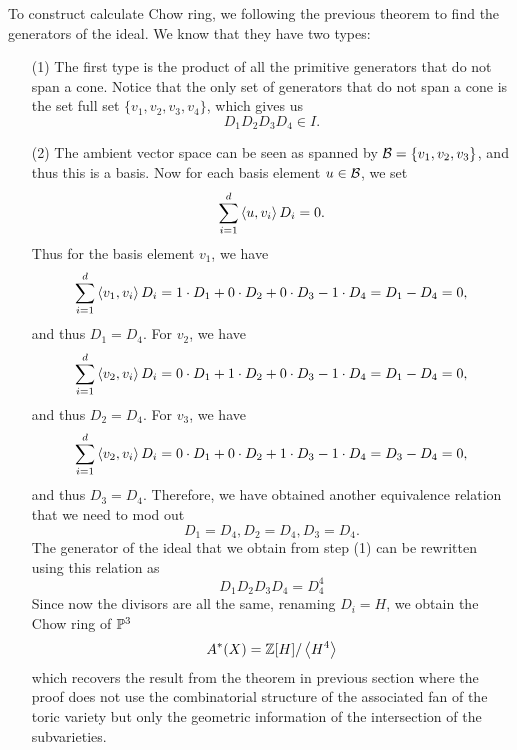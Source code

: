 \begin{example}
		To construct calculate Chow ring, we following 
		the previous theorem to find the generators of the ideal.
		We know that they have two types:
		\begin{enumerate}
			\item[(1)] The first type is the product of 
				all the primitive generators that do not span a cone.
				Notice that the only set of generators that 
				do not span a cone is the set full set 
				$\{v_1, v_2, v_3, v_4\}$,
				which gives us 
				\[
				D_1 D_2 D_3 D_4 \in I.
				\]
			\item[(2)] 
				The ambient vector space can be seen as 
				spanned by $\calb = \{v_1, v_2, v_3\}$,
				and thus this is a basis.
				Now for each basis element $u \in \calb$,
				we set 
				\[
				\sum\limits_{i = 1}^{d} \inner{u, v_i} D_i = 0. 
				\] 
				Thus for the basis element $v_1$, we have
				\[
				\sum\limits_{i = 1}^d \inner{v_1, v_i} D_i 
				= 1 \cdot D_1 + 0 \cdot D_2 + 0 \cdot D_3 - 1 \cdot D_4 = D_1 - D_4 = 0,
				\] and thus $D_1 = D_4$. 
				For $v_2$, we have 
				\[
				\sum\limits_{i = 1}^d \inner{v_2, v_i} D_i 
				= 0 \cdot D_1 + 1 \cdot D_2 + 0 \cdot D_3 - 1 \cdot D_4 = D_1 - D_4 = 0,
				\] and thus $D_2 = D_4$. 
				For $v_3$, we have 
				\[
				\sum\limits_{i = 1}^d \inner{v_2, v_i} D_i 
				= 0 \cdot D_1 + 0 \cdot D_2 + 1 \cdot D_3 - 1 \cdot D_4 = D_3 - D_4 = 0,
				\] and thus $D_3 = D_4$. 
				Therefore, 
				we have obtained another equivalence relation 
				that we need to mod out 
				\[
				D_1 = D_4, D_2 = D_4, D_3 = D_4.
				\]
				The generator of the ideal 
				that we obtain from step (1)
				can be rewritten using this relation as 
				\[
				D_1 D_2 D_3 D_4 = D_4^4
				\]
				Since now the divisors are all the same,
				renaming $D_i = H$, 
				we obtain the Chow ring of $\P^3$
				\[
				A^\ast(X) = \Z[H]/\inner{H^4}
				\]
				which recovers the result from the theorem 
				in previous section 
				where the proof does not use the combinatorial 
				structure of the associated fan of the toric variety 
				but only the geometric information 
				of the intersection of the subvarieties. 	
		\end{enumerate}
	
	\end{example}	
	
